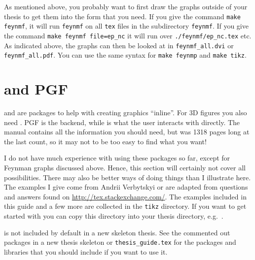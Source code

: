 As mentioned above, you probably want to first draw the graphs outside
of your thesis to get them into the form that you need. If you give
the command \texttt{make feynmf}, it will run \texttt{feynmf} on all
\texttt{tex} files in the subdirectory \texttt{feynmf}. If you give
the command \texttt{make feynmf file=ep\_nc} it will run over
\texttt{./feynmf/ep\_nc.tex} etc. As indicated above, the graphs can
then be looked at in \texttt{feynmf\_all.dvi} or\\
\texttt{feynmf\_all.pdf}. You can use the same syntax for
\texttt{make feynmp} and \texttt{make tikz}.


\section{\TikZ and PGF}%
\label{sec:fig:tikz}

 and  are packages to help with
creating graphics \enquote{inline}.
For 3D figures you also need .
PGF is the backend, while \TikZ is what the user interacts with directly.
The manual contains all the information you should need,
but was 1318 pages long at the last count,
so it may not to be too easy to find what you want!

I do not have much experience with using these packages so far,
except for Feynman graphs discussed above.
Hence, this section will certainly not cover all possibilities. There may
also be better ways of doing things than I illustrate here. The
examples I give come from Andrii Verbytskyi or are adapted from
questions and answers found on
\url{http://tex.stackexchange.com/}.
The examples included in this
guide and a few more are collected in the \texttt{tikz} directory.
If you want to get started with \TikZ you can copy this directory
into your thesis directory, e.g.\ .

\TikZ is not included by default in a new skeleton thesis. See the
commented out packages in a new thesis skeleton or
\texttt{thesis\_guide.tex} for the packages and \TikZ libraries that
you should include if you want to use it.


